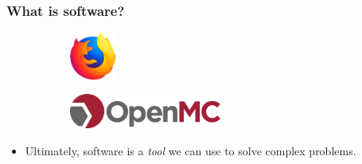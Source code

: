 \begin{frame}
  \frametitle{What is software?}
  \begin{figure}[htpb]
      \centering
      \begin{subfigure}
        \centering
        \includegraphics[width=1.5cm]{images/firefox-logo.png}
      \end{subfigure}
      \hspace{1cm}
      \begin{subfigure}
        \centering
        \includegraphics[width=5cm]{images/openmc-logo.png}
      \end{subfigure}
  \end{figure}
  \pause\medskip
  \begin{itemize}
      \item Ultimately, software is a {\it tool} we can use to solve complex problems.
  \end{itemize}
\end{frame}

